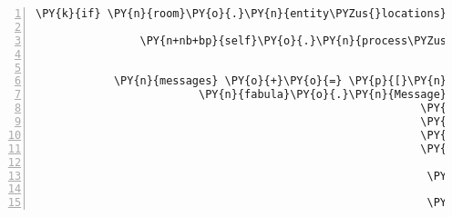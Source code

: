 \begin{Verbatim}[commandchars=\\\{\},numbers=left,firstnumber=1,stepnumber=1]
            \PY{k}{if} \PY{n}{room}\PY{o}{.}\PY{n}{entity\PYZus{}locations}\PY{p}{[}\PY{l+s}{\PYZsq{}}\PY{l+s}{spider}\PY{l+s}{\PYZsq{}}\PY{p}{]} \PY{o}{==} \PY{p}{(}\PY{l+m+mi}{1}\PY{p}{,} \PY{l+m+mi}{0}\PY{p}{)}\PY{p}{:}

                \PY{n+nb+bp}{self}\PY{o}{.}\PY{n}{process\PYZus{}TriesToMoveEvent}\PY{p}{(}\PY{n}{fabula}\PY{o}{.}\PY{n}{TriesToMoveEvent}\PY{p}{(}\PY{n}{identifier}\PY{o}{=}\PY{l+s}{\PYZsq{}}\PY{l+s}{spider}\PY{l+s}{\PYZsq{}}\PY{p}{,}
                                                                      \PY{n}{target\PYZus{}identifier}\PY{o}{=}\PY{p}{(}\PY{l+m+mi}{0}\PY{p}{,} \PY{l+m+mi}{4}\PY{p}{)}\PY{p}{)}\PY{p}{)}

            \PY{n}{messages} \PY{o}{+}\PY{o}{=} \PY{p}{[}\PY{n}{fabula}\PY{o}{.}\PY{n}{Message}\PY{p}{(}\PY{p}{[}\PY{n}{fabula}\PY{o}{.}\PY{n}{DeleteEvent}\PY{p}{(}\PY{n}{identifier}\PY{o}{=}\PY{l+s}{\PYZsq{}}\PY{l+s}{cobweb}\PY{l+s}{\PYZsq{}}\PY{p}{)}\PY{p}{]}\PY{p}{)}\PY{p}{,}
                         \PY{n}{fabula}\PY{o}{.}\PY{n}{Message}\PY{p}{(}\PY{p}{[}\PY{n}{fabula}\PY{o}{.}\PY{n}{SpawnEvent}\PY{p}{(}\PY{n}{fabula}\PY{o}{.}\PY{n}{Entity}\PY{p}{(}\PY{l+s}{\PYZsq{}}\PY{l+s}{bridge}\PY{l+s}{\PYZsq{}}\PY{p}{,}
                                                           \PY{n}{fabula}\PY{o}{.}\PY{n}{ITEM}\PY{p}{,}
                                                           \PY{n+nb+bp}{False}\PY{p}{,}
                                                           \PY{n+nb+bp}{False}\PY{p}{,}
                                                           \PY{p}{\PYZob{}}\PY{l+s}{\PYZsq{}}\PY{l+s}{image/png}\PY{l+s}{\PYZsq{}}\PY{p}{:} \PY{n}{fabula}\PY{o}{.}\PY{n}{Asset}\PY{p}{(}\PY{n}{uri}\PY{o}{=}\PY{l+s}{\PYZsq{}}\PY{l+s}{1x1\PYZhy{}empty.png}\PY{l+s}{\PYZsq{}}\PY{p}{,}
                                                                                      \PY{n}{data}\PY{o}{=}\PY{n+nb+bp}{None}\PY{p}{)}\PY{p}{,}
                                                            \PY{l+s}{\PYZsq{}}\PY{l+s}{audio/ogg}\PY{l+s}{\PYZsq{}}\PY{p}{:} \PY{n}{fabula}\PY{o}{.}\PY{n}{Asset}\PY{p}{(}\PY{n}{uri}\PY{o}{=}\PY{l+s}{\PYZsq{}}\PY{l+s}{teleport.ogg}\PY{l+s}{\PYZsq{}}\PY{p}{,}
                                                                                      \PY{n}{data}\PY{o}{=}\PY{n+nb+bp}{None}\PY{p}{)}\PY{p}{,}
                                                            \PY{l+s}{\PYZsq{}}\PY{l+s}{text/plain}\PY{l+s}{\PYZsq{}}\PY{p}{:} \PY{n}{fabula}\PY{o}{.}\PY{n}{Asset}\PY{p}{(}\PY{n}{uri}\PY{o}{=}\PY{l+s}{\PYZsq{}}\PY{l+s}{bridge.txt}\PY{l+s}{\PYZsq{}}\PY{p}{,}

\end{Verbatim}
